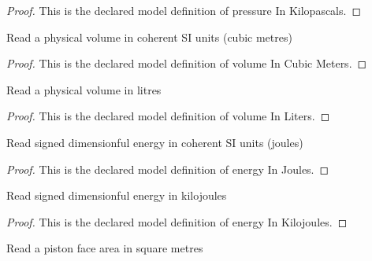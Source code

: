 \begin{proof}
  This is the declared model definition of pressure In Kilopascals.
\end{proof}
\begin{definition}
  \label{def:physics:phyx-mini-0449:phyxminiproblems-problemphyxmini0449-volumeincubicmeters}
  Read a physical volume in coherent SI units (cubic metres)
\end{definition}
\begin{proof}
  This is the declared model definition of volume In Cubic Meters.
\end{proof}
\begin{definition}
  \label{def:physics:phyx-mini-0449:phyxminiproblems-problemphyxmini0449-volumeinliters}
  Read a physical volume in litres
\end{definition}
\begin{proof}
  This is the declared model definition of volume In Liters.
\end{proof}
\begin{definition}
  \label{def:physics:phyx-mini-0449:phyxminiproblems-problemphyxmini0449-energyinjoules}
  Read signed dimensionful energy in coherent SI units (joules)
\end{definition}
\begin{proof}
  This is the declared model definition of energy In Joules.
\end{proof}
\begin{definition}
  \label{def:physics:phyx-mini-0449:phyxminiproblems-problemphyxmini0449-energyinkilojoules}
  Read signed dimensionful energy in kilojoules
\end{definition}
\begin{proof}
  This is the declared model definition of energy In Kilojoules.
\end{proof}
\begin{definition}
  \label{def:physics:phyx-mini-0449:phyxminiproblems-problemphyxmini0449-areainsquaremeters}
  Read a piston face area in square metres
\end{definition}

